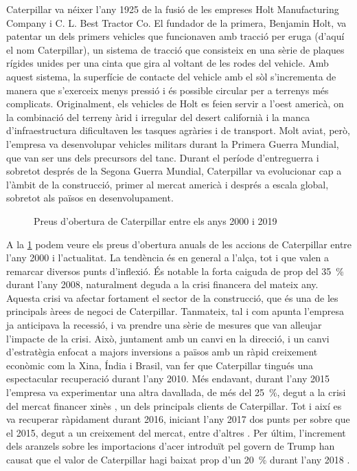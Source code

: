 \documentclass{article}
\numberwithin{table}{section}
\numberwithin{figure}{section}
\numberwithin{equation}{section}
\begin{document}
Caterpillar va néixer l'any 1925 de la fusió de les empreses Holt Manufacturing Company i C. L. Best Tractor Co. El fundador de la primera, Benjamin Holt, va patentar un dels primers vehicles que funcionaven amb tracció per eruga (d'aquí el nom Caterpillar), un sistema de tracció que consisteix en una sèrie de plaques rígides unides per una cinta que gira al voltant de les rodes del vehicle. Amb aquest sistema, la superfície de contacte del vehicle amb el sòl s'incrementa de manera que s'exerceix menys pressió i és possible circular per a terrenys més complicats. Originalment, els vehicles de Holt es feien servir a l'oest americà, on la combinació del terreny àrid i irregular del desert californià i la manca d'infraestructura dificultaven les tasques agràries i de transport. Molt aviat, però, l'empresa va desenvolupar vehicles militars durant la Primera Guerra Mundial, que van ser uns dels precursors del tanc. Durant el període d'entreguerra i sobretot després de la Segona Guerra Mundial, Caterpillar va evolucionar cap a l'àmbit de la construcció, primer al mercat americà i després a escala global, sobretot als països en desenvolupament. 

\begin{figure}[htb]
	\centering \sffamily \small
	
	\caption{Preus d'obertura de Caterpillar entre els anys 2000 i 2019}
	\label{fig:tancament}
\end{figure}

A la \cref{fig:tancament} podem veure els preus d'obertura anuals de les accions de Caterpillar entre l'any 2000 i l'actualitat. La tendència és en general a l'alça, tot i que valen a remarcar diversos punts d'inflexió. És notable la forta caiguda de prop del \SI{35}{\percent} durant l'any 2008, naturalment deguda a la crisi financera del mateix any. Aquesta crisi va afectar fortament el sector de la construcció, que és una de les principals àrees de negoci de Caterpillar. Tanmateix, tal i com apunta \cite{recupera} l'empresa ja anticipava la recessió, i va prendre una sèrie de mesures que van alleujar l'impacte de la crisi. Això, juntament amb un canvi en la direcció, i un canvi d'estratègia enfocat a majors inversions a països amb un ràpid creixement econòmic com la Xina, Índia i Brasil, van fer que Caterpillar tingués una espectacular recuperació durant l'any 2010. Més endavant, durant l'any 2015 l'empresa va experimentar una altra davallada, de més del \SI{25}{\percent}, degut a la crisi del mercat financer xinès \cite{xina}, un dels principals clients de Caterpillar. Tot i així es va recuperar ràpidament durant 2016, iniciant l'any 2017 dos punts per sobre que el 2015, degut a un creixement del mercat, entre d'altres \cite{crush}. Per últim, l'increment dels aranzels sobre les importacions d'acer introduït pel govern de Trump han causat que el valor de Caterpillar hagi baixat prop d'un \SI{20}{\percent} durant l'any 2018 \cite{trump}.
\end{document}
